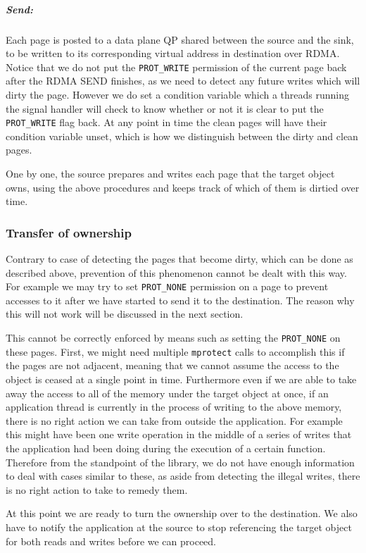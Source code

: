 \subparagraph{Send:} Each page is posted to a data plane QP shared between the
source and the sink, to be written to its corresponding virtual address in
destination over RDMA. Notice that we do not put the \texttt{PROT\_WRITE} permission
of the current page back after the RDMA SEND finishes, as we need to
detect any future writes which will dirty the page.
However we do set a condition variable which a threads running the signal
handler will check to know whether or not it is clear to put the \texttt{PROT\_WRITE} flag back.
At any point in time the clean pages will have their condition variable unset,
which is how we distinguish between the dirty and clean pages.

One by one, the source prepares and writes each page that the target object
owns, using the above procedures and keeps track of which of them is dirtied
over time.

\subsubsection{Transfer of ownership}

Contrary to case of detecting the pages that become dirty, which can be done
as described above, prevention of this phenomenon cannot be dealt with this way.
For example we may try to set \texttt{PROT\_NONE} permission on a page to
prevent accesses to it after we have started to send it to the destination.
The reason why this will not work will be discussed in the next section.


This cannot be correctly enforced by means such as setting the
\texttt{PROT\_NONE} on these pages. First, we might need multiple
\texttt{mprotect} calls to accomplish this if the pages are not adjacent,
meaning that we cannot assume the access to the object is ceased at a single
point in time. Furthermore even if we are able to take away the access to all
of the memory under the target object at once, if an application thread is
currently in the process of writing to the above memory, there is no right
action we can take from outside the application. For example this might have
been one write operation in the middle of a series of writes that the
application had been doing during the execution of a certain function.
Therefore
from the standpoint of the library, we do not have enough information to deal
with cases similar to these, as aside from detecting the illegal writes, there
is no right action to take to remedy them.

\label{sec:transferownership}
At this point we are ready to turn the ownership over to the destination.
We also have to notify the application at the source to stop referencing the
target object for both reads and writes before we can proceed.

